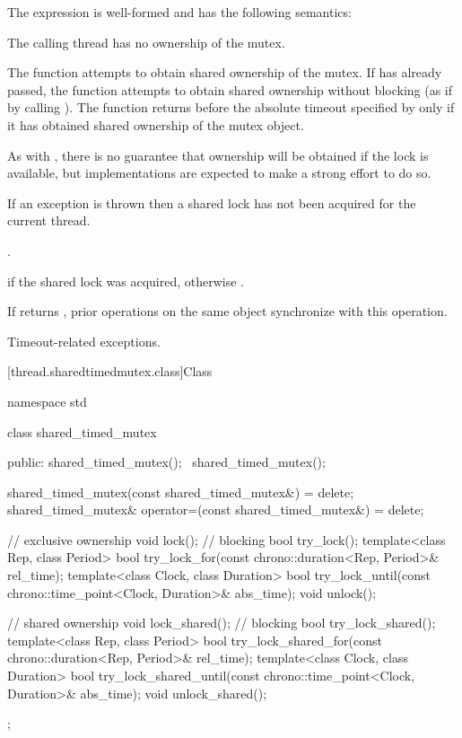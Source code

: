 \pnum
The expression  is well-formed
and has the following semantics:

\begin{itemdescr}
\pnum
\expects
The calling thread has no ownership of the mutex.

\pnum
\effects
The function attempts to obtain shared ownership of the mutex. If
 has already passed, the function attempts to obtain shared
ownership without blocking (as if by calling ). The
function returns before the absolute timeout
specified by  only if it has obtained shared ownership of the
mutex object.
\begin{note}
As with , there is no guarantee that
ownership will be obtained if the lock is available, but implementations are
expected to make a strong effort to do so.
\end{note}
If an exception is thrown then a shared lock has not been acquired for
the current thread.

\pnum
\returntype {}.

\pnum
\returns
{} if the shared lock was acquired, otherwise .

\pnum
\sync
If  returns , prior
 operations on the same object synchronize
with this operation.

\pnum
\throws
Timeout-related exceptions.
\end{itemdescr}

[thread.sharedtimedmutex.class]{Class }

%
\begin{codeblock}
namespace std {
  class shared_timed_mutex {
  public:
    shared_timed_mutex();
    ~shared_timed_mutex();

    shared_timed_mutex(const shared_timed_mutex&) = delete;
    shared_timed_mutex& operator=(const shared_timed_mutex&) = delete;

    // exclusive ownership
    void lock();                // blocking
    bool try_lock();
    template<class Rep, class Period>
      bool try_lock_for(const chrono::duration<Rep, Period>& rel_time);
    template<class Clock, class Duration>
      bool try_lock_until(const chrono::time_point<Clock, Duration>& abs_time);
    void unlock();

    // shared ownership
    void lock_shared();         // blocking
    bool try_lock_shared();
    template<class Rep, class Period>
      bool try_lock_shared_for(const chrono::duration<Rep, Period>& rel_time);
    template<class Clock, class Duration>
      bool try_lock_shared_until(const chrono::time_point<Clock, Duration>& abs_time);
    void unlock_shared();
  };
}
\end{codeblock}


